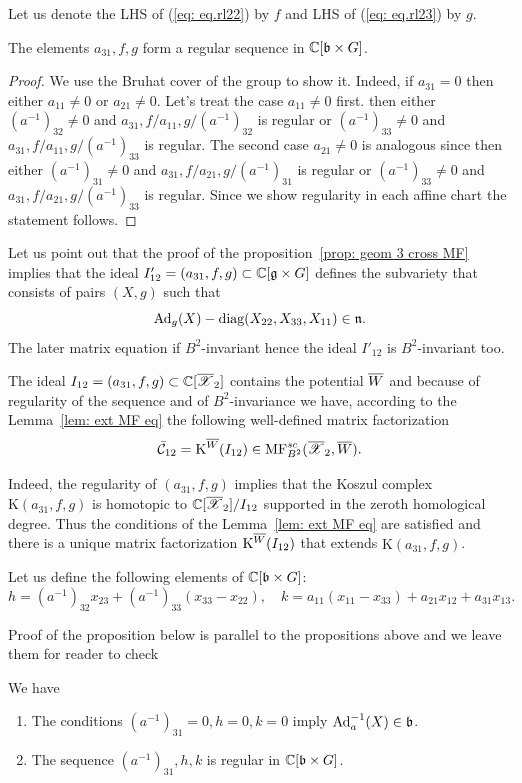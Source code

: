 Let us denote the LHS of (\ref{eq: eq.rl22}) by $f$ and LHS of (\ref{eq: eq.rl23}) by $g$.

\begin{proposition} The elements $a_{31},f,g$ form  a regular sequence in $\mathbb{C}[\mathfrak{b}\times G]$.
\end{proposition}
\begin{proof}
We use the Bruhat cover of the group to show it.
Indeed, if $a_{31}=0$ then either $a_{11}\ne 0$ or $a_{21}\ne 0$. Let's treat the case $a_{11}\ne 0$ first.
then either $(a^{-1})_{32}\ne 0$ and
$a_{31}, f/a_{11}, g/(a^{-1})_{32}$ is regular
or $(a^{-1})_{33}\ne 0$ and $a_{31}, f/a_{11}, g/(a^{-1})_{33}$ is regular.
The second case $a_{21}\ne 0$ is analogous since then either $(a^{-1})_{31}\ne 0$ and
$a_{31}, f/a_{21}, g/(a^{-1})_{31}$ is regular or $(a^{-1})_{33}\ne 0$ and
$a_{31}, f/a_{21}, g/(a^{-1})_{33}$ is regular. Since we show regularity in each affine chart the statement follows.
\end{proof}

Let us point out that the proof of the proposition~\ref{prop: geom 3 cross MF}  implies that the ideal $I'_{12}=(a_{31},f,g)\subset \mathbb{C}[\mathfrak{g}\times G]$  defines the subvariety
that consists of pairs $(X,g)$ such that
$$ {\rm Ad}_g(X)-\textup{diag}(X_{22},X_{33},X_{11})\in \mathfrak{n}.$$
The later matrix equation if $B^2$-invariant hence the ideal $I'_{12}$ is $B^2$-invariant too.

The ideal $I_{12}=(a_{31},f,g)\subset \mathbb{C}[\overline{\mathscr{X}}_2]$ contains the potential $\overline{W}$  and because of regularity of the sequence  and of $B^2$-invariance we have, according to the Lemma~\ref{lem: ext MF eq}
the following well-defined matrix factorization
$$\bar{\mathcal{C}}_{12}=\mathrm{K}^{\overline{W}}(I_{12})\in \mathrm{MF}^{sc}_{B^2}(\overline{\mathscr{X}}_2,\overline{W}).$$

Indeed, the regularity of \((a_{31},f,g)\) implies that the Koszul complex \(\mathrm{K}(a_{31},f,g)\) is homotopic to \(\mathbb{C}[\overline{\mathscr{X}}_2]/I_{12}\) supported in the zeroth homological degree. Thus the conditions of
the Lemma~\ref{lem: ext MF eq} are satisfied and there is a unique matrix factorization \(\mathrm{K}^{\overline{W}}(I_{12})\) that extends \(\mathrm{K}(a_{31},f,g)\).

Let us define the following elements of $\mathbb{C}[\mathfrak{b}\times G]$:
$$ h=(a^{-1})_{32} x_{23}+(a^{-1})_{33}(x_{33}-x_{22}),\quad k=a_{11}(x_{11}-x_{33})+a_{21}x_{12}+a_{31}x_{13}.$$

Proof of the proposition below is parallel to the propositions above and we leave them for reader to check
\begin{proposition}We have
\begin{enumerate}
\item The conditions $(a^{-1})_{31}=0, h=0, k=0$ imply ${\rm Ad}^{-1}_{a}(X)\in \mathfrak{b}$.
\item The sequence $(a^{-1})_{31}, h, k$ is regular in $\mathbb{C}[\mathfrak{b}\times G]$.
\end{enumerate}
\end{proposition}

